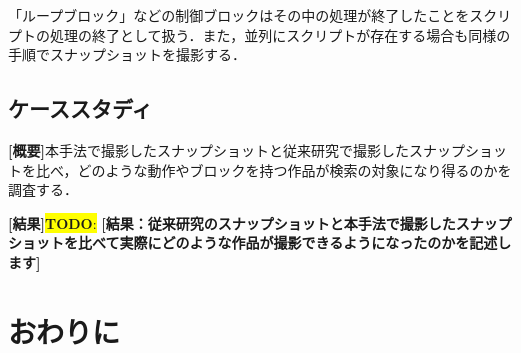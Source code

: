 \documentclass[uplatex,dvipdfmx,a4paper,twocolumn,base=11pt,jbase=11pt,ja=standard]{bxjsarticle}  %
\newcommand{\todo}[1]{\colorbox{yellow}{{\bf TODO}:}{\color{red} {\textbf{[#1]}}}}
\begin{document}
「ループブロック」などの制御ブロックはその中の処理が終了したことをスクリプトの処理の終了として扱う．また，並列にスクリプトが存在する場合も同様の手順でスナップショットを撮影する．


\subsection{ケーススタディ}
\noindent\textbf{[概要]}本手法で撮影したスナップショットと従来研究で撮影したスナップショットを比べ，どのような動作やブロックを持つ作品が検索の対象になり得るのかを調査する．

\noindent\textbf{[結果]}\todo{結果：従来研究のスナップショットと本手法で撮影したスナップショットを比べて実際にどのような作品が撮影できるようになったのかを記述します}








\section{おわりに}



\end{document}

